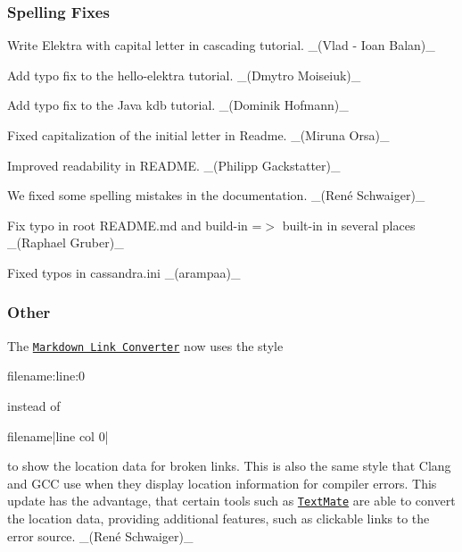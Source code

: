 \subsubsection*{Spelling Fixes}


\begin{DoxyItemize}
\item Write Elektra with capital letter in cascading tutorial. \+\_\+(Vlad -\/ Ioan Balan)\+\_\+
\item Add typo fix to the hello-\/elektra tutorial. \+\_\+(\+Dmytro Moiseiuk)\+\_\+
\item Add typo fix to the Java kdb tutorial. \+\_\+(\+Dominik Hofmann)\+\_\+
\item Fixed capitalization of the initial letter in Readme. \+\_\+(\+Miruna Orsa)\+\_\+
\item Improved readability in R\+E\+A\+D\+ME. \+\_\+(\+Philipp Gackstatter)\+\_\+
\item We fixed some spelling mistakes in the documentation. \+\_\+(René Schwaiger)\+\_\+
\item Fix typo in root R\+E\+A\+D\+M\+E.\+md and \textquotesingle{}build-\/in\textquotesingle{} =$>$ \textquotesingle{}built-\/in\textquotesingle{} in several places \+\_\+(\+Raphael Gruber)\+\_\+
\item Fixed typos in {\ttfamily cassandra.\+ini} \+\_\+(arampaa)\+\_\+
\end{DoxyItemize}

\subsubsection*{Other}


\begin{DoxyItemize}
\item The \href{https://master.libelektra.org/doc/markdownlinkconverter}{\tt Markdown Link Converter} now uses the style
\end{DoxyItemize}


\begin{DoxyCode}
filename:line:0
\end{DoxyCode}


instead of


\begin{DoxyCode}
filename|line col 0|
\end{DoxyCode}


to show the location data for broken links. This is also the same style that Clang and G\+CC use when they display location information for compiler errors. This update has the advantage, that certain tools such as \href{https://macromates.com}{\tt Text\+Mate} are able to convert the location data, providing additional features, such as clickable links to the error source. \+\_\+(René Schwaiger)\+\_\+


